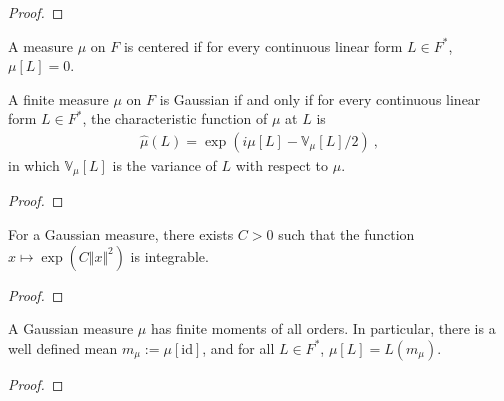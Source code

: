 \begin{proof}

\end{proof}


\begin{definition}\label{def:IsCentered}
A measure $\mu$ on $F$ is centered if for every continuous linear form $L \in F^*$, $\mu[L] = 0$.
\end{definition}


\begin{theorem}\label{thm:isGaussian_iff_charFunCLM_eq}
A finite measure $\mu$ on $F$ is Gaussian if and only if for every continuous linear form $L \in F^*$, the characteristic function of $\mu$ at $L$ is
\begin{align*}
  \hat{\mu}(L) = \exp\left(i \mu[L] - \mathbb{V}_\mu[L] / 2\right) \: ,
\end{align*}
in which $\mathbb{V}_\mu[L]$ is the variance of $L$ with respect to $\mu$.
\end{theorem}

\begin{proof}

\end{proof}


\begin{theorem}\label{thm:IsGaussian.exists_integrable_exp_sq}
For a Gaussian measure, there exists $C > 0$ such that the function $x \mapsto \exp (C \Vert x \Vert ^ 2)$ is integrable.
\end{theorem}

\begin{proof}

\end{proof}


\begin{lemma}\label{lem:IsGaussian.memLp_id}
A Gaussian measure $\mu$ has finite moments of all orders.
In particular, there is a well defined mean $m_\mu := \mu[\mathrm{id}]$, and for all $L \in F^*$, $\mu[L] = L(m_\mu)$.
\end{lemma}

\begin{proof}

\end{proof}


